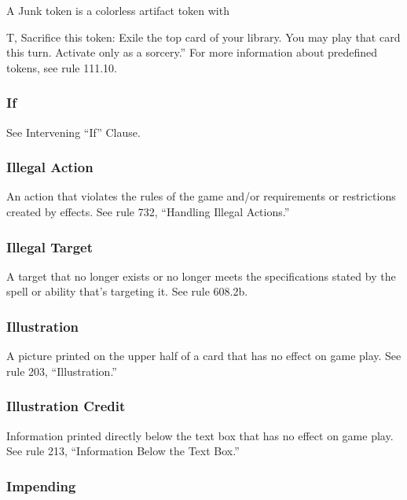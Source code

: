 {{{{{{{{{{{{{{{A Junk token is a colorless artifact token with {T, Sacrifice this token: Exile the top card of your library. You may play that card this turn. Activate only as a sorcery.” For more information about predefined tokens, see rule 111.10.

\subsubsection*{If}

See Intervening “If” Clause.

\subsubsection*{Illegal Action}

An action that violates the rules of the game and/or requirements or restrictions created by effects. See rule 732, “Handling Illegal Actions.”

\subsubsection*{Illegal Target}

A target that no longer exists or no longer meets the specifications stated by the spell or ability that’s targeting it. See rule 608.2b.

\subsubsection*{Illustration}

A picture printed on the upper half of a card that has no effect on game play. See rule 203, “Illustration.”

\subsubsection*{Illustration Credit}

Information printed directly below the text box that has no effect on game play. See rule 213, “Information Below the Text Box.”

\subsubsection*{Impending}

}}}}}}}}}}}}}}}}
